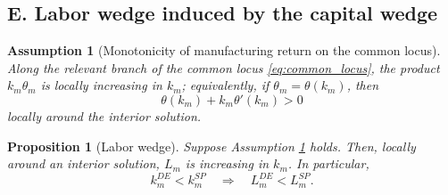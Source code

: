 \documentclass[12pt]{article}
\newtheorem{proposition}{Proposition}
\newtheorem{assumption}{Assumption}
\begin{document}

\subsection*{E. Labor wedge induced by the capital wedge}

\begin{assumption}[Monotonicity of manufacturing return on the common locus]\label{ass:returnmono}
Along the relevant branch of the common locus \eqref{eq:common_locus}, the product $k_m\theta_m$ is locally increasing in $k_m$; equivalently, if $\theta_m=\theta(k_m)$, then
\[
\theta(k_m)+k_m\theta'(k_m)>0
\]
locally around the interior solution.
\end{assumption}

\begin{proposition}[Labor wedge]\label{prop:Lwedge}
Suppose Assumption \ref{ass:returnmono} holds. Then, locally around an interior solution, $L_m$ is increasing in $k_m$. In particular,
\[
k_m^{DE}<k_m^{SP}\quad\Longrightarrow\quad L_m^{DE}<L_m^{SP}.
\]
\end{proposition}
\end{document}
